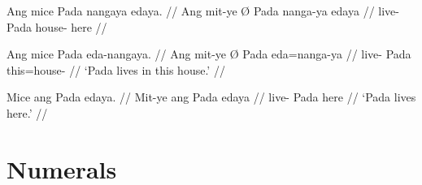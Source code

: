 \pex
\a\ljudge*\label{ex:edayamod}\begingl
	\gla Ang mice {} Pada nangaya edaya. //
	\glb Ang mit-ye Ø Pada nanga-ya edaya //
	\glc \AgtT{} live-\TsgF{} \Top{} Pada house-\Loc{} here //
\endgl

\a\label{ex:edanp}\begingl
	\gla Ang mice {} Pada eda-nangaya. //
	\glb Ang mit-ye Ø Pada eda=nanga-ya //
	\glc \AgtT{} live-\TsgF{} \Top{} Pada this=house-\Loc{} //
	\glft `Pada lives in this house.' //
\endgl

\a\label{ex:edanyapro}\begingl
	\gla Mice ang Pada edaya. //
	\glb Mit-ye ang Pada edaya //
	\glc live-\TsgF{} \Aarg{} Pada here //
	\glft `Pada lives here.' //
\endgl

\xe



\section{Numerals}

